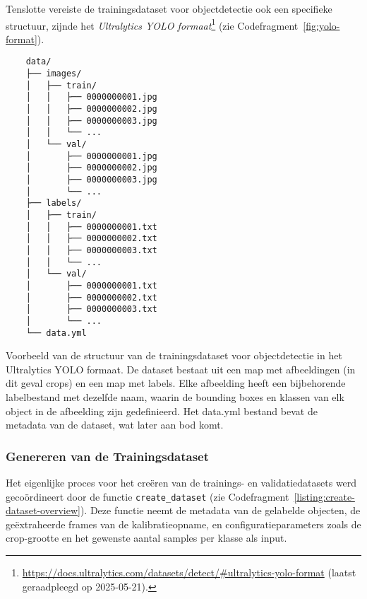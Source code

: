 Tenslotte vereiste de trainingsdataset voor objectdetectie ook een specifieke structuur, zijnde het 
\textit{Ultralytics YOLO formaat}\footnote{\url{https://docs.ultralytics.com/datasets/detect/\#ultralytics-yolo-format} (laatst geraadpleegd op 2025-05-21).} (zie Codefragment~\ref{fig:yolo-format}).

\begin{listing}[H]
  \begin{verbatim}
    data/
    ├── images/
    │   ├── train/
    │   │   ├── 0000000001.jpg
    │   │   ├── 0000000002.jpg
    │   │   ├── 0000000003.jpg
    │   │   └── ...
    │   └── val/
    │       ├── 0000000001.jpg
    │       ├── 0000000002.jpg
    │       ├── 0000000003.jpg
    │       └── ...
    ├── labels/
    │   ├── train/
    │   │   ├── 0000000001.txt
    │   │   ├── 0000000002.txt
    │   │   ├── 0000000003.txt
    │   │   └── ...
    │   └── val/
    │       ├── 0000000001.txt
    │       ├── 0000000002.txt
    │       ├── 0000000003.txt
    │       └── ...
    └── data.yml
  \end{verbatim}
  \caption[Voorbeeld van het Ultralytics YOLO Formaat]{
    \label{fig:yolo-format}
    Voorbeeld van de structuur van de trainingsdataset voor objectdetectie in het Ultralytics YOLO formaat.
    De dataset bestaat uit een map met afbeeldingen (in dit geval crops) en een map met labels.
    Elke afbeelding heeft een bijbehorende labelbestand met dezelfde naam, waarin de bounding boxes en klassen van elk object in de afbeelding zijn gedefinieerd.
    Het data.yml bestand bevat de metadata van de dataset, wat later aan bod komt.
  }
\end{listing}

\subsubsection{Genereren van de Trainingsdataset}

Het eigenlijke proces voor het creëren van de trainings- en validatiedatasets werd gecoördineert door de functie \texttt{create\_dataset} 
(zie Codefragment~\ref{listing:create-dataset-overview}). 
Deze functie neemt de metadata van de gelabelde objecten, de geëxtraheerde frames van de kalibratieopname, 
en configuratieparameters zoals de crop-grootte en het gewenste aantal samples per klasse als input.

